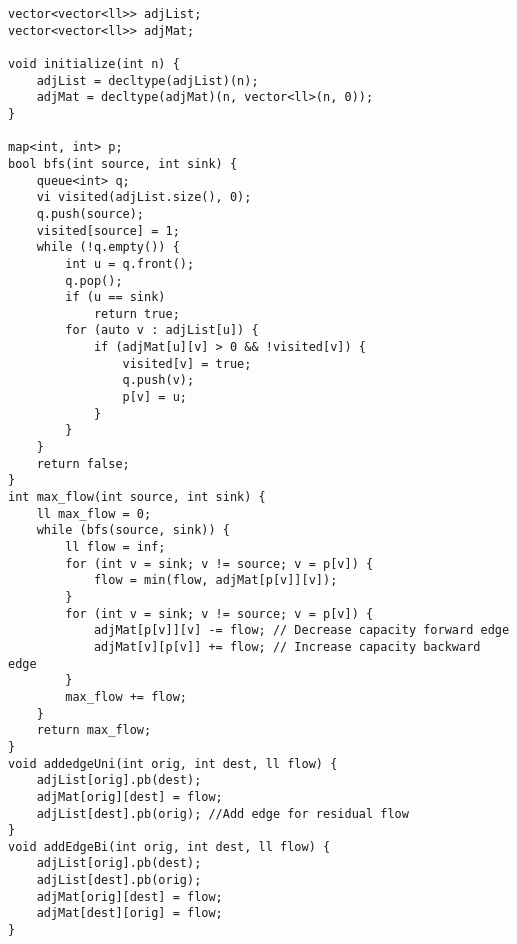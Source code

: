 \documentclass[a4paper,10pt]{article}
\begin{document}
\begin{multicols}{2}
\begin{verbatim}
vector<vector<ll>> adjList;
vector<vector<ll>> adjMat;

void initialize(int n) {
    adjList = decltype(adjList)(n);
    adjMat = decltype(adjMat)(n, vector<ll>(n, 0));
}

map<int, int> p;
bool bfs(int source, int sink) {
    queue<int> q;
    vi visited(adjList.size(), 0);
    q.push(source);
    visited[source] = 1;
    while (!q.empty()) {
        int u = q.front();
        q.pop();
        if (u == sink)
            return true;
        for (auto v : adjList[u]) {
            if (adjMat[u][v] > 0 && !visited[v]) {
                visited[v] = true;
                q.push(v);
                p[v] = u;
            }
        }
    }
    return false;
}
int max_flow(int source, int sink) {
    ll max_flow = 0;
    while (bfs(source, sink)) {
        ll flow = inf;
        for (int v = sink; v != source; v = p[v]) {
            flow = min(flow, adjMat[p[v]][v]);
        }
        for (int v = sink; v != source; v = p[v]) {
            adjMat[p[v]][v] -= flow; // Decrease capacity forward edge
            adjMat[v][p[v]] += flow; // Increase capacity backward edge
        }
        max_flow += flow;
    }
    return max_flow;
}
void addedgeUni(int orig, int dest, ll flow) {
    adjList[orig].pb(dest);
    adjMat[orig][dest] = flow;
    adjList[dest].pb(orig); //Add edge for residual flow
}
void addEdgeBi(int orig, int dest, ll flow) {
    adjList[orig].pb(dest);
    adjList[dest].pb(orig);
    adjMat[orig][dest] = flow;
    adjMat[dest][orig] = flow;
}

\end{verbatim}
\end{multicols}
\end{document}
